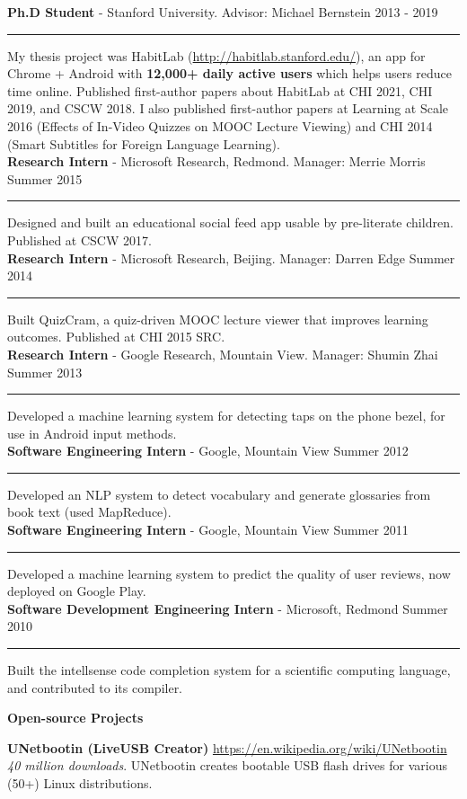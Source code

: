 \documentclass[10pt,A4]{article}
\newcommand{\cvsection}[1]
{
	\begin{center}
		\large\textcolor{sectcol}{\textbf{#1}}
	\end{center}
}
\newcommand{\cvevtzero}[4]
{

	\textbf{#2} - \textcolor{bgcol}{#3} \hfill \vspace{2.5pt}\textcolor{sectcol}{#1}

\vspace{-8pt}
\textcolor{softcol}{\hrule}
\vspace{6pt}

}
\newcommand{\cvevtone}[4]
{

	\textbf{#2} - \textcolor{bgcol}{#3} \hfill \vspace{2.5pt}\textcolor{sectcol}{#1}

\vspace{-8pt}
\textcolor{softcol}{\hrule}
\vspace{6pt}

  #4\\[3pt]

}
\begin{document}
\cvevtzero{2013 - 2019}{Ph.D Student}{Stanford University. Advisor: Michael Bernstein}\\
My thesis project was HabitLab (\url{http://habitlab.stanford.edu/}), an app for Chrome + Android with \textbf{12,000+ daily active users} which helps users reduce time online. Published first-author papers about HabitLab at CHI 2021, CHI 2019, and CSCW 2018. I also published first-author papers at Learning at Scale 2016 (Effects of In-Video Quizzes on MOOC Lecture Viewing) and CHI 2014 (Smart Subtitles for Foreign Language Learning).\\ %

%
\cvevtone{Summer 2015}{Research Intern}{Microsoft Research, Redmond. Manager: Merrie Morris}{Designed and built an educational social feed app usable by pre-literate children. Published at CSCW 2017.}

\cvevtone{Summer 2014}{Research Intern}{Microsoft Research, Beijing. Manager: Darren Edge}{Built QuizCram, a quiz-driven MOOC lecture viewer that improves learning outcomes. Published at CHI 2015 SRC.}

\cvevtone{Summer 2013}{Research Intern}{Google Research, Mountain View. Manager: Shumin Zhai}{Developed a machine learning system for detecting taps on the phone bezel, for use in Android input methods.}

\cvevtone{Summer 2012}{Software Engineering Intern}{Google, Mountain View}{Developed an NLP system to detect vocabulary and generate glossaries from book text (used MapReduce).}

\cvevtone{Summer 2011}{Software Engineering Intern}{Google, Mountain View}{Developed a machine learning system to predict the quality of user reviews, now deployed on Google Play.}

\cvevtone{Summer 2010}{Software Development Engineering Intern}{Microsoft, Redmond}{Built the intellsense code completion system for a scientific computing language, and contributed to its compiler.}


\cvsection{Open-source Projects}

\textbf{UNetbootin (LiveUSB Creator)} \hfill \url{https://en.wikipedia.org/wiki/UNetbootin}\\ %
\emph{40 million downloads}. UNetbootin creates bootable USB flash drives for various (50+) Linux distributions.\\ %
\end{document}
